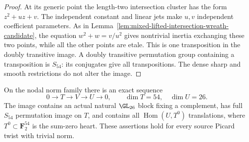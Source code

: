 \begin{proof}
At its generic point the length-two intersection cluster has
the form $z^2+uz+v$. The independent constant and linear jets
make $u,v$ independent coefficient parameters. As in
Lemma~\ref{lem:mixed-lifted-intersection-wreath-candidate},
the equation $w^2+w=v/u^2$ gives nontrivial inertia exchanging
these two points, while all the other points are etale.
This is one transposition in the doubly transitive image.
A doubly transitive permutation group containing a
transposition is $S_{54}$: its conjugates give all transpositions.
The dense sharp and smooth restrictions do not alter the image.
\end{proof}

\begin{lemma}
\label{lem:mixed-d3-norm-block-shears-candidate}
On the nodal norm family there is an exact sequence
\[
       0\longrightarrow T\longrightarrow V\longrightarrow U
          \longrightarrow0,
       \qquad \dim T=54,\quad\dim U=26.
\]
The image contains an actual natural $\GL_{26}$ block fixing a
complement, has full $S_{54}$ permutation image on $T$, and
contains all $\operatorname{Hom}(U,T^0)$ translations, where
$T^0\subset\mathbf F_2^{54}$ is the sum-zero heart. These
assertions hold for every source Picard twist with trivial norm.
\end{lemma}

